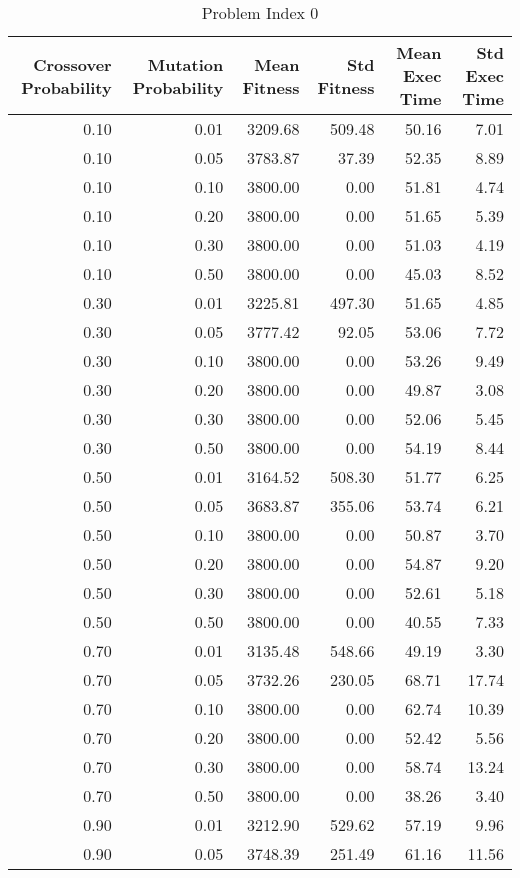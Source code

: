 \begin{table}
\caption{Problem Index 0}
\label{tab:problem_0}
\begin{tabular}{rrrrrr}
\toprule
Crossover Probability & Mutation Probability & Mean Fitness & Std Fitness & Mean Exec Time & Std Exec Time \\
\midrule
0.10 & 0.01 & 3209.68 & 509.48 & 50.16 & 7.01 \\
0.10 & 0.05 & 3783.87 & 37.39 & 52.35 & 8.89 \\
0.10 & 0.10 & 3800.00 & 0.00 & 51.81 & 4.74 \\
0.10 & 0.20 & 3800.00 & 0.00 & 51.65 & 5.39 \\
0.10 & 0.30 & 3800.00 & 0.00 & 51.03 & 4.19 \\
0.10 & 0.50 & 3800.00 & 0.00 & 45.03 & 8.52 \\
0.30 & 0.01 & 3225.81 & 497.30 & 51.65 & 4.85 \\
0.30 & 0.05 & 3777.42 & 92.05 & 53.06 & 7.72 \\
0.30 & 0.10 & 3800.00 & 0.00 & 53.26 & 9.49 \\
0.30 & 0.20 & 3800.00 & 0.00 & 49.87 & 3.08 \\
0.30 & 0.30 & 3800.00 & 0.00 & 52.06 & 5.45 \\
0.30 & 0.50 & 3800.00 & 0.00 & 54.19 & 8.44 \\
0.50 & 0.01 & 3164.52 & 508.30 & 51.77 & 6.25 \\
0.50 & 0.05 & 3683.87 & 355.06 & 53.74 & 6.21 \\
0.50 & 0.10 & 3800.00 & 0.00 & 50.87 & 3.70 \\
0.50 & 0.20 & 3800.00 & 0.00 & 54.87 & 9.20 \\
0.50 & 0.30 & 3800.00 & 0.00 & 52.61 & 5.18 \\
0.50 & 0.50 & 3800.00 & 0.00 & 40.55 & 7.33 \\
0.70 & 0.01 & 3135.48 & 548.66 & 49.19 & 3.30 \\
0.70 & 0.05 & 3732.26 & 230.05 & 68.71 & 17.74 \\
0.70 & 0.10 & 3800.00 & 0.00 & 62.74 & 10.39 \\
0.70 & 0.20 & 3800.00 & 0.00 & 52.42 & 5.56 \\
0.70 & 0.30 & 3800.00 & 0.00 & 58.74 & 13.24 \\
0.70 & 0.50 & 3800.00 & 0.00 & 38.26 & 3.40 \\
0.90 & 0.01 & 3212.90 & 529.62 & 57.19 & 9.96 \\
0.90 & 0.05 & 3748.39 & 251.49 & 61.16 & 11.56 \\

\end{tabular}
\end{table}
